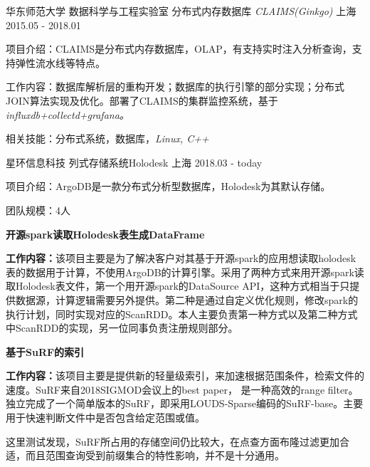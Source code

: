 \begin{cventries}
  \cventry
    {华东师范大学 \quad 数据科学与工程实验室  } 
    {分布式内存数据库  \it{CLAIMS(Ginkgo)}}
    {上海}
    {2015.05 - 2018.01}
    {
      \begin{cvitems}
	\item {项目介绍：CLAIMS是分布式内存数据库，OLAP，有支持实时注入分析查询，支持弹性流水线等特点。}
	\item {工作内容：数据库解析层的重构开发；数据库的执行引擎的部分实现；分布式JOIN算法实现及优化。部署了CLAIMS的集群监控系统，基于\it{influxdb+collectd+grafana}。}
	\item {相关技能：分布式系统，数据库，\it{Linux, C++}}
      \end{cvitems}
    }

    \cventry
    {星环信息科技}
    {列式存储系统Holodesk}
    {上海}
    {2018.03 - today}
    {
      \begin{cvitems}
        \item {项目介绍：ArgoDB是一款分布式分析型数据库，Holodesk为其默认存储。}
        \item {团队规模：4人}
      \end{cvitems}
    }

    \cventry
    {\textbf{开源spark读取Holodesk表生成DataFrame}}{}{}{}
    {
        \begin{cvitems}
          \item {\textbf{工作内容：}该项目主要是为了解决客户对其基于开源spark的应用想读取holodesk表的数据用于计算，不使用ArgoDB的计算引擎。采用了两种方式来用开源spark读取Holodesk表文件，第一个用开源spark的DataSource API，这种方式相当于只提供数据源，计算逻辑需要另外提供。第二种是通过自定义优化规则，修改spark的执行计划，同时实现对应的ScanRDD。本人主要负责第一种方式以及第二种方式中ScanRDD的实现，另一位同事负责注册规则部分。}
        \end{cvitems}
    }

    \cventry
    {\textbf{基于SuRF的索引}}{}{}{}
    {
        \begin{cvitems}
          \item {\textbf{工作内容：}该项目主要是提供新的轻量级索引，来加速根据范围条件，检索文件的速度。SuRF来自2018SIGMOD会议上的best paper， 是一种高效的range filter。独立完成了一个简单版本的SuRF，即采用LOUDS-Sparse编码的SuRF-base。主要用于快速判断文件中是否包含给定范围或值。}
	  \item {这里测试发现，SuRF所占用的存储空间仍比较大，在点查方面布隆过滤更加合适，而且范围查询受到前缀集合的特性影响，并不是十分通用。}
        \end{cvitems}
    }


\end{cventries}

